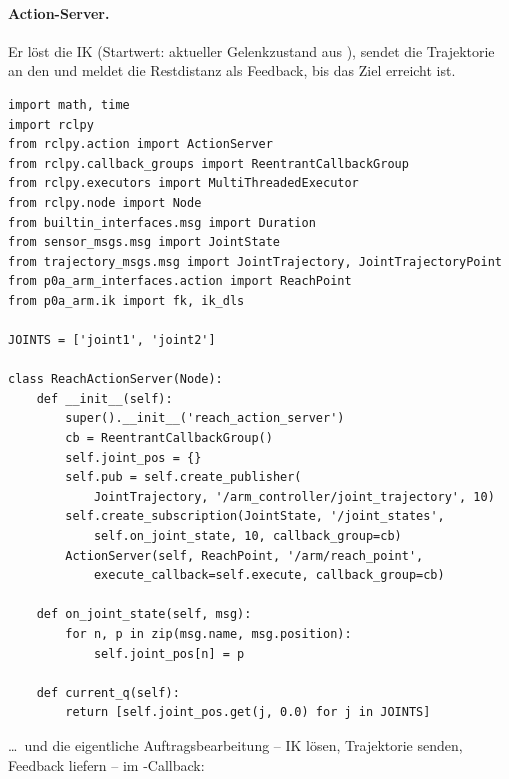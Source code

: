 \paragraph{Action-Server.} Er löst die IK (Startwert: aktueller Gelenkzustand
aus ), sendet die Trajektorie an den 
und meldet die Restdistanz als Feedback, bis das Ziel erreicht ist.
\begin{lstlisting}[style=py,caption={\code{p0a\_arm/reach\_action\_server.py} (Kern)}]
import math, time
import rclpy
from rclpy.action import ActionServer
from rclpy.callback_groups import ReentrantCallbackGroup
from rclpy.executors import MultiThreadedExecutor
from rclpy.node import Node
from builtin_interfaces.msg import Duration
from sensor_msgs.msg import JointState
from trajectory_msgs.msg import JointTrajectory, JointTrajectoryPoint
from p0a_arm_interfaces.action import ReachPoint
from p0a_arm.ik import fk, ik_dls

JOINTS = ['joint1', 'joint2']

class ReachActionServer(Node):
    def __init__(self):
        super().__init__('reach_action_server')
        cb = ReentrantCallbackGroup()
        self.joint_pos = {}
        self.pub = self.create_publisher(
            JointTrajectory, '/arm_controller/joint_trajectory', 10)
        self.create_subscription(JointState, '/joint_states',
            self.on_joint_state, 10, callback_group=cb)
        ActionServer(self, ReachPoint, '/arm/reach_point',
            execute_callback=self.execute, callback_group=cb)

    def on_joint_state(self, msg):
        for n, p in zip(msg.name, msg.position):
            self.joint_pos[n] = p

    def current_q(self):
        return [self.joint_pos.get(j, 0.0) for j in JOINTS]
\end{lstlisting}
\noindent \ldots\ und die eigentliche Auftragsbearbeitung -- IK lösen,
Trajektorie senden, Feedback liefern -- im -Callback:
